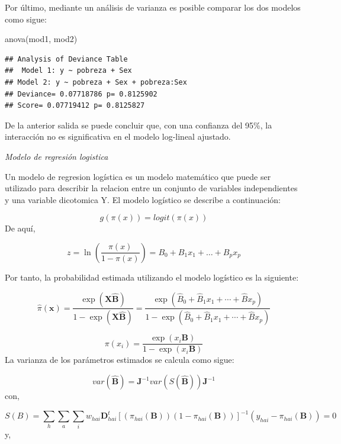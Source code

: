 \documentclass[
  12pt,
]{book}
\newenvironment{Shaded}{\begin{snugshade}}{\end{snugshade}}
\newcommand{\FunctionTok}[1]{\textcolor[rgb]{0.00,0.00,0.00}{#1}}
\newcommand{\NormalTok}[1]{#1}
\begin{document}
Por último, mediante un análisis de varianza es posible comparar los dos modelos como sigue:

\begin{Shaded}
\begin{Highlighting}[]
\FunctionTok{anova}\NormalTok{(mod1, mod2)}
\end{Highlighting}
\end{Shaded}

\begin{verbatim}
## Analysis of Deviance Table
##  Model 1: y ~ pobreza + Sex
## Model 2: y ~ pobreza + Sex + pobreza:Sex 
## Deviance= 0.07718786 p= 0.8125902 
## Score= 0.07719412 p= 0.8125827
\end{verbatim}

De la anterior salida se puede concluir que, con una confianza del 95\%, la interacción no es significativa en el modelo log-lineal ajustado.

\emph{Modelo de regresión logistica}

Un modelo de regresion logística es un modelo matemático que puede ser utilizado para describir la relacion entre un conjunto de variables independientes y una variable dicotomica Y. El modelo logístico se describe a continuación:

\[
    g(\pi(x))=logit(\pi(x)) 
\]
De aquí,

\[
z = \ln\left(\frac{\pi(x)}{1-\pi(x)}\right) = B_0 + B_1x_1+\dots+B_px_p
\]

Por tanto, la probabilidad estimada utilizando el modelo logístico es la siguiente:

\[
    \hat{\pi}\left(\boldsymbol{x}\right)=\frac{\exp\left(\boldsymbol{X\hat{B}}\right)}{1-\exp\left(\boldsymbol{X\hat{B}}\right)}=\frac{\exp\left(\hat{B}_{0}+\hat{B}_{1}x_{1}+\cdots+\hat{B}x_{p}\right)}{1-\exp\left(\hat{B}_{0}+\hat{B}_{1}x_{1}+\cdots+\hat{B}x_{p}\right)}
\]

\[
    \pi\left(x_{i}\right)=\frac{\exp\left(x_{i}\boldsymbol{B}\right)}{1-\exp\left(x_{i}\boldsymbol{B}\right)}
\]
La varianza de los parámetros estimados se calcula como sigue:

\[
    var\left(\boldsymbol{\hat{B}}\right)=\boldsymbol{J}^{-1}var\left(S\left(\hat{\boldsymbol{B}}\right)\right)\boldsymbol{J}^{-1}
\]
con,

\[
    S\left(B\right)=\sum_{h}\sum_{a}\sum_{i}w_{hai}\boldsymbol{D}_{hai}^{t}\left[\left(\pi_{hai}\left(\boldsymbol{B}\right)\right)\left(1-\pi_{hai}\left(\boldsymbol{B}\right)\right)\right]^{-1}\left(y_{hai}-\pi_{hai}\left(\boldsymbol{B}\right)\right)=0
\]
y,
\end{document}

